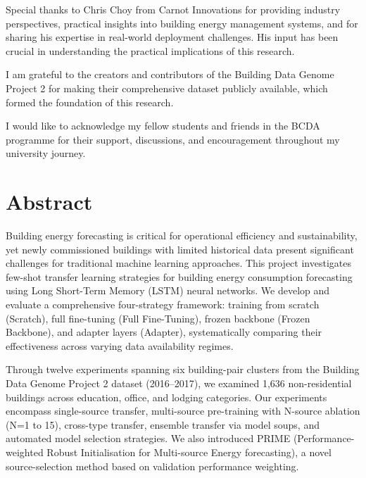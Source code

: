 \documentclass[12pt,a4paper]{report}
\begin{document}
Special thanks to Chris Choy from Carnot Innovations for providing industry perspectives, practical insights into building energy management systems, and for sharing his expertise in real-world deployment challenges. His input has been crucial in understanding the practical implications of this research.

I am grateful to the creators and contributors of the Building Data Genome Project 2 for making their comprehensive dataset publicly available, which formed the foundation of this research.

I would like to acknowledge my fellow students and friends in the BCDA programme for their support, discussions, and encouragement throughout my university journey.

\clearpage

\chapter*{Abstract}

Building energy forecasting is critical for operational efficiency and sustainability, yet newly commissioned buildings with limited historical data present significant challenges for traditional machine learning approaches. This project investigates few-shot transfer learning strategies for building energy consumption forecasting using Long Short-Term Memory (LSTM) neural networks. We develop and evaluate a comprehensive four-strategy framework: training from scratch (Scratch), full fine-tuning (Full Fine-Tuning), frozen backbone (Frozen Backbone), and adapter layers (Adapter), systematically comparing their effectiveness across varying data availability regimes.

Through twelve experiments spanning six building-pair clusters from the Building Data Genome Project 2 dataset (2016--2017), we examined 1,636 non-residential buildings across education, office, and lodging categories. Our experiments encompass single-source transfer, multi-source pre-training with N-source ablation (N=1 to 15), cross-type transfer, ensemble transfer via model soups, and automated model selection strategies. We also introduced PRIME (Performance-weighted Robust Initialisation for Multi-source Energy forecasting), a novel source-selection method based on validation performance weighting.
\end{document}
